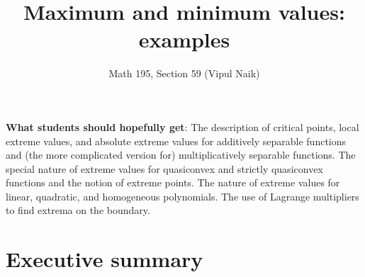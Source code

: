 \documentclass[10pt]{amsart}
\title{Maximum and minimum values: examples}
\author{Math 195, Section 59 (Vipul Naik)}
\begin{document}
\maketitle

{\bf What students should hopefully get}: The description of critical
points, local extreme values, and absolute extreme values for
additively separable functions and (the more complicated version for)
multiplicatively separable functions. The special nature of extreme
values for quasiconvex and strictly quasiconvex functions and the
notion of extreme points. The nature of extreme values for linear,
quadratic, and homogeneous polynomials. The use of Lagrange
multipliers to find extrema on the boundary.
\section*{Executive summary}
\end{document}
